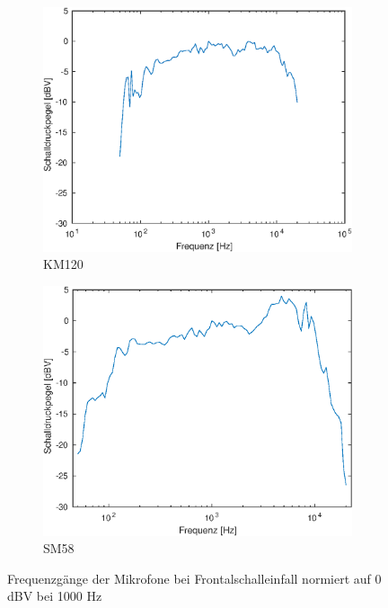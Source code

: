 \begin{figure}[bth]
    \centering
    \begin{subfigure}{.5\textwidth}
        \centering
        \caption{KM120}
        \includegraphics[width=0.95\linewidth]{Figures/km120_0}
    \end{subfigure}%
    \begin{subfigure}{.5\textwidth}
        \centering
        \caption{SM58}
        \includegraphics[width=0.95\linewidth]{Figures/sm58_0}
    \end{subfigure}
    \caption{Frequenzgänge der Mikrofone bei Frontalschalleinfall normiert auf 0 dBV bei 1000 Hz}
    \label{fig:freq_0}
\end{figure}

